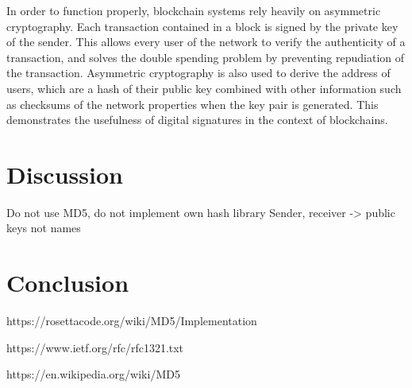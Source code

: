 \documentclass{article}
\begin{document}
\bigskip

In order to function properly, blockchain systems rely heavily on asymmetric cryptography. Each transaction contained in a block is signed by the private key of the sender. This allows every user of the network to verify the authenticity of a transaction, and solves the double spending problem by preventing repudiation of the transaction. Asymmetric cryptography is also used to derive the address of users, which are a hash of their public key combined with other information such as checksums of the network properties when the key pair is generated. This demonstrates the usefulness of digital signatures in the context of blockchains.


\section{Discussion}

Do not use MD5, do not implement own hash library
Sender, receiver -> public keys not names

\section{Conclusion}


\bigskip





https://rosettacode.org/wiki/MD5/Implementation

https://www.ietf.org/rfc/rfc1321.txt  

https://en.wikipedia.org/wiki/MD5  
\end{document}

